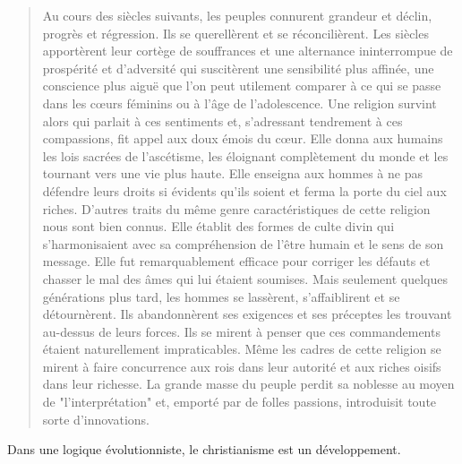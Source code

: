 \begin{quote}
Au cours des siècles suivants, les peuples connurent grandeur et déclin,
progrès et régression. Ils se querellèrent et se réconcilièrent. Les
siècles apportèrent leur cortège de souffrances et une alternance
ininterrompue de prospérité et d'adversité qui suscitèrent une
sensibilité plus affinée, une conscience plus aiguë que l'on peut
utilement comparer à ce qui se passe dans les cœurs féminins ou à l'âge
de l'adolescence. Une religion survint alors qui parlait à ces
sentiments et, s'adressant tendrement à ces compassions, fit appel aux
doux émois du cœur. Elle donna aux humains les lois sacrées de
l'ascétisme, les éloignant complètement du monde et les tournant vers
une vie plus haute. Elle enseigna aux hommes à ne pas défendre leurs
droits si évidents qu'ils soient et ferma la porte du ciel aux riches.
D'autres traits du même genre caractéristiques de cette religion nous
sont bien connus. Elle établit des formes de culte divin qui
s'harmonisaient avec sa compréhension de l'être humain et le sens de son
message. Elle fut remarquablement efficace pour corriger les défauts et
chasser le mal des âmes qui lui étaient soumises. Mais seulement
quelques générations plus tard, les hommes se lassèrent, s'affaiblirent
et se détournèrent. Ils abandonnèrent ses exigences et ses préceptes les
trouvant au-dessus de leurs forces. Ils se mirent à penser que ces
commandements étaient naturellement impraticables. Même les cadres de
cette religion se mirent à faire concurrence aux rois dans leur autorité
et aux riches oisifs dans leur richesse. La grande masse du peuple
perdit sa noblesse au moyen de "l'interprétation" et, emporté par de
folles passions, introduisit toute sorte d'innovations.
\end{quote}

Dans une logique évolutionniste, le christianisme est un développement.


